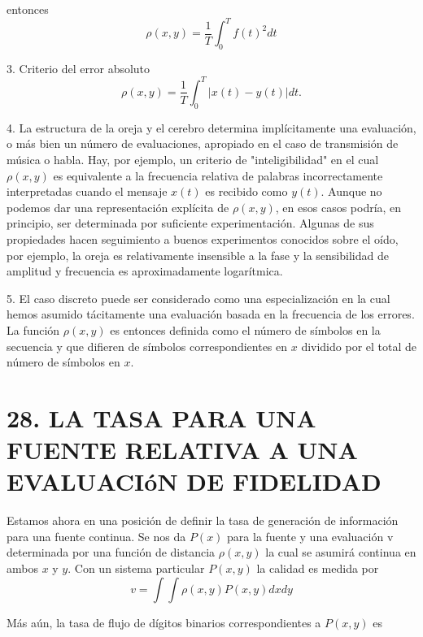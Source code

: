 entonces
\begin{equation} \rho (x, y) = \frac{1}{T} \int_0^T f(t)^{2} dt \end{equation}
			
3. Criterio del error absoluto
\begin{equation} \rho(x,y) = \frac{1}{T} \int_0^T | x(t) - y(t)| dt. \end{equation}
			
4. La estructura de la oreja y el cerebro determina impl\'icitamente una evaluaci\'on,
o m\'as bien un n\'umero de evaluaciones, apropiado en el caso de transmisi\'on
de m\'usica o habla. Hay, por ejemplo, un criterio de "inteligibilidad" en el cual
$\rho(x,y)$ es equivalente a la frecuencia relativa de palabras incorrectamente
interpretadas cuando el mensaje $x(t)$ es recibido como $y(t)$. Aunque no podemos
dar una representaci\'on expl\'icita de $\rho(x,y)$, en esos casos podr\'ia, en principio,
ser determinada por suficiente experimentaci\'on. Algunas de sus propiedades hacen
seguimiento a buenos experimentos conocidos sobre el o\'ido, por ejemplo, la 
oreja es relativamente insensible a la fase y la sensibilidad de amplitud y frecuencia
es aproximadamente logar\'itmica.

5. El caso discreto puede ser considerado como una especializaci\'on en la cual 
hemos asumido t\'acitamente una evaluaci\'on basada en la frecuencia de los errores.
La funci\'on $\rho(x,y)$ es entonces definida como el n\'umero de s\'imbolos en la secuencia y
que difieren de s\'imbolos correspondientes en $x$ dividido por el total de n\'umero
de s\'imbolos en $x$.

\section{28. LA TASA PARA UNA FUENTE RELATIVA A UNA EVALUACI\'oN DE FIDELIDAD}

Estamos ahora en una posici\'on de definir la tasa de generaci\'on de informaci\'on para
una fuente continua. Se nos da $P(x)$ para la fuente y una evaluaci\'on v determinada
por una funci\'on de distancia $\rho(x,y)$ la cual se asumir\'a continua en ambos $x$ y $y$.
Con un sistema particular $P(x,y)$ la calidad es medida por
\begin{equation} v = \int \int \rho(x,y) P(x,y) dx dy\end{equation}
			
M\'as a\'un, la tasa de flujo de d\'igitos binarios correspondientes a $P(x,y)$ es

